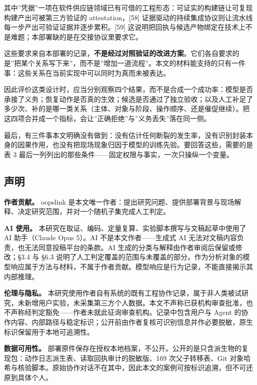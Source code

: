 \documentclass[
]{article}
\begin{document}
其中''凭据''一项在软件供应链领域已有可借的工程形态：可证实的构建链让可复现构建产出可被第三方验证的
attestation，{[}58{]}
证据驱动的持续集成协议则让流水线每一步产出可验证证据并逐步累积。{[}59{]}
这说明把回执与候选产物绑定在技术上不是难题；本部署缺的是在交接协议里要求它。

这些要求来自本部署的记录，\textbf{不是经过对照验证的改进方案}。它们各自要求的是''把某个关系写下来''，而不是''增加一道流程''。本文的材料能支持的只有一件事：这些关系在当前实现中可以同时为真而未被表达。

因此评价这类设计时，应当分别观察四个结果，而不是合成一个成功率：模型是否承接了义务；恢复动作是否真的生效；候选是否通过了独立验收；以及人工补足了多少次、补的是哪一类关系（主体、对象与阶段、操作顺序、还是催促继续）。把这四项合并成一个指标，会让''正确拒绝''与''义务丢失''落在同一侧。

最后，有三件事本文明确没有做到：没有估计任何断裂的发生率，没有识别封装本身的因果作用，也没有把现场现象归因于模型的训练先验。要回答这些，需要的是表
3 最后一列列出的那些条件------固定权限与事实，一次只操纵一个变量。

\subsection{声明}\label{ux58f0ux660e}

\textbf{作者贡献。} oopslink
是本文唯一作者：提出研究问题、提供部署背景与现场解释、决定研究范围，并对一个随机子集完成人工判定。

\textbf{AI 使用。}
本研究在取证、编码、定量复算、实验脚本撰写与文稿起草中使用了 AI
助手（Claude Opus 5）。AI 不是本文作者------生成式 AI
无法对文稿内容负责，也无法同意投稿平台的条款。AI
生成的分类与解释由作者审阅后保留或修改；§3.4 与 §6.3
说明了人工判定覆盖的范围与未覆盖的部分。作为分析对象的模型响应属于方法与材料，不属于作者贡献。模型响应是行为记录，不能直接揭示其内部推理。

\textbf{伦理与隐私。}
本研究使用作者自有系统的既有工程协作记录，属于非人类被试研究，未新增用户实验，未采集第三方个人数据。本文不声称已获机构审查批准，也不声称经判定豁免------作者未就此征询审查机构。记录中包含用户与
Agent
的协作内容、内部路径与稳定标识；公开前由作者复核可识别信息并作必要脱敏，原生标识保留用于本地可追溯性。

\textbf{数据可用性。}
部署原件保存在授权本地档案，不公开。公开的是只含派生物的复现包：动作日志派生表、读取回执审计的脱敏版、169
次父子转移表、Git
对象哈希与核验脚本。原始协作对话不在其中，因此本文的案例可按标识追溯，但不可还原到具体个人。
\end{document}
